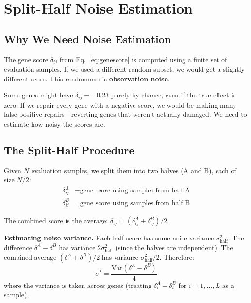 \documentclass[11pt,letterpaper]{article}
\theoremstyle{definition}
\begin{document}
\section{Split-Half Noise Estimation}
\label{sec:splithalf}

\subsection{Why We Need Noise Estimation}

The gene score $\delta_{ij}$ from Eq.~\ref{eq:genescore} is computed using a finite set of evaluation samples. If we used a different random subset, we would get a slightly different score. This randomness is \textbf{observation noise}.

Some genes might have $\delta_{ij} = -0.23$ purely by chance, even if the true effect is zero. If we repair every gene with a negative score, we would be making many false-positive repairs---reverting genes that weren't actually damaged. We need to estimate how noisy the scores are.

\subsection{The Split-Half Procedure}

Given $N$ evaluation samples, we split them into two halves (A and B), each of size $N/2$:
\begin{align}
\delta^A_{ij} &= \text{gene score using samples from half A} \\
\delta^B_{ij} &= \text{gene score using samples from half B}
\end{align}

The combined score is the average: $\delta_{ij} = (\delta^A_{ij} + \delta^B_{ij}) / 2$.

\textbf{Estimating noise variance.} Each half-score has some noise variance $\sigma^2_\text{half}$. The difference $\delta^A - \delta^B$ has variance $2\sigma^2_\text{half}$ (since the halves are independent). The combined average $(\delta^A + \delta^B)/2$ has variance $\sigma^2_\text{half}/2$. Therefore:
\begin{equation}
\sigma^2 = \frac{\text{Var}(\delta^A - \delta^B)}{4}
\label{eq:noisevar}
\end{equation}
where the variance is taken across genes (treating $\delta^A_i - \delta^B_i$ for $i = 1, \ldots, L$ as a sample).
\end{document}
